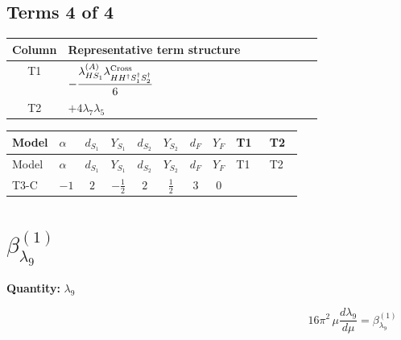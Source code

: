 \documentclass[8pt]{article}
\begin{document}
\begin{landscape}
\subsection*{Terms 4 of 4}
\begin{center}
\begin{tabular}{@{}c >{\raggedright\arraybackslash}p{0.82\linewidth}@{}}
\toprule
Column & Representative term structure \\
\midrule
T1 & \(\displaystyle -\frac{{\lambda_{HS_1}^{(A)}} {\lambda_{H H^\dagger S_1^\dagger S_2^\dagger}^{\rm Cross}}}{6}\) \\
\midrule
T2 & \(\displaystyle +4 {\lambda_{7}} {\lambda_5}\) \\
\midrule
\bottomrule
\end{tabular}
\end{center}
\smallskip
\tiny
\begin{longtable}{@{}llcccccc >{\raggedright\arraybackslash}p{0.21\linewidth} >{\raggedright\arraybackslash}p{0.21\linewidth}@{}}
\toprule
Model & $\alpha$ & $d_{S_1}$ & $Y_{S_1}$ & $d_{S_2}$ & $Y_{S_2}$ & $d_F$ & $Y_F$ & T1 & T2 \\
\midrule
\endfirsthead
\toprule
Model & $\alpha$ & $d_{S_1}$ & $Y_{S_1}$ & $d_{S_2}$ & $Y_{S_2}$ & $d_F$ & $Y_F$ & T1 & T2 \\
\midrule
\endhead
T3-C & $-1$ & $2$ & $-\frac{1}{2}$ & $2$ & $\frac{1}{2}$ & $3$ & $0$ & \scriptsize\adjustbox{max width=\linewidth}{$\begin{gathered} -\frac{{\lambda_{HS_1}^{(A)}} {\lambda_{H H^\dagger S_1^\dagger S_2^\dagger}^{\rm Cross}}}{6}\end{gathered}$} & \scriptsize\adjustbox{max width=\linewidth}{$\begin{gathered} +4 {\lambda_{7}} {\lambda_5}\end{gathered}$} \\
\midrule
\bottomrule
\end{longtable}
\clearpage
\section*{$\beta_{\lambda_{9}}^{(1)}$}
\noindent\textbf{Quantity: }$\lambda_{9}$\par\smallskip
\[16\pi^2\,\mu\frac{d \lambda_{9}}{d\mu}=\beta_{\lambda_{9}}^{(1)}\]

\end{landscape}
\end{document}
